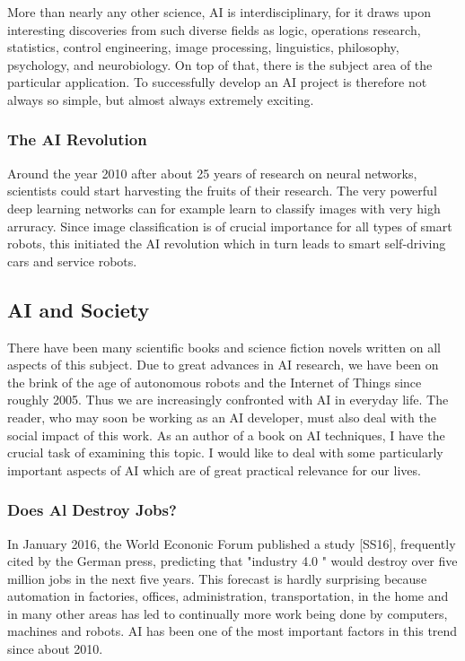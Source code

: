 \documentclass[10pt]{article}
\begin{document}
More than nearly any other science, AI is interdisciplinary, for it draws upon interesting discoveries from such diverse fields as logic, operations research, statistics, control engineering, image processing, linguistics, philosophy, psychology, and neurobiology. On top of that, there is the subject area of the particular application. To successfully develop an AI project is therefore not always so simple, but almost always extremely exciting.

\subsubsection*{The AI Revolution}
Around the year 2010 after about 25 years of research on neural networks, scientists could start harvesting the fruits of their research. The very powerful deep learning networks can for example learn to classify images with very high arruracy. Since image classification is of crucial importance for all types of smart robots, this initiated the AI revolution which in turn leads to smart self-driving cars and service robots.

\subsection*{AI and Society}
There have been many scientific books and science fiction novels written on all aspects of this subject. Due to great advances in AI research, we have been on the brink of the age of autonomous robots and the Internet of Things since roughly 2005. Thus we are increasingly confronted with AI in everyday life. The reader, who may soon be working as an AI developer, must also deal with the social impact of this work. As an author of a book on AI techniques, I have the crucial task of examining this topic. I would like to deal with some particularly important aspects of AI which are of great practical relevance for our lives.

\subsubsection*{Does Al Destroy Jobs?}
In January 2016, the World Econonic Forum published a study [SS16], frequently cited by the German press, predicting that "industry 4.0 " would destroy over five\\
million jobs in the next five years. This forecast is hardly surprising because automation in factories, offices, administration, transportation, in the home and in many other areas has led to continually more work being done by computers, machines and robots. AI has been one of the most important factors in this trend since about 2010.
\end{document}
